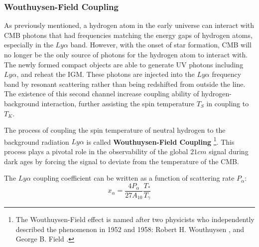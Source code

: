 \documentclass[12pt, TexShade, letterpaper]{report}
\begin{document}
\subsubsection{Wouthuysen-Field Coupling}
As previously mentioned, a hydrogen atom in the early universe can interact with CMB photons that had frequencies matching the energy gaps of hydrogen atoms, especially in the $Ly\alpha$ band. However, with the onset of star formation, CMB will no longer be the only source of photons for the hydrogen atom to interact with. The newly formed compact objects are able to generate UV photons including $Ly\alpha$, and reheat the IGM. These photons are injected into the $Ly\alpha$ frequency band by resonant scattering rather than being redshifted from outside the line. The existence of this second channel increase coupling ability of hydrogen-background interaction, further assisting the spin temperature $T_S$ in coupling to $T_K$.\par
The process of coupling the spin temperature of neutral hydrogen to the background radiation $Ly\alpha$ is called \textbf{Wouthuysen-Field Coupling} \cite{barkana2001beginning}\footnote{The Wouthuysen-Field effect is named after two physicists who independently described the phenomenon in 1952 and 1958: Robert H. Wouthuysen \cite{wouthuysen_original}, and George B. Field \cite{field_original}.}. This process plays a pivotal role in the observability of the global $21cm$ signal during dark ages by forcing the signal to deviate from the temperature of the CMB.\par
The $Ly\alpha$ coupling coefficient can be written as a function of scattering rate $P_\alpha$:
\begin{equation}
    x_\alpha = \frac{4P_\alpha}{27 A_{10}} \frac{T_*}{T_\gamma}
\end{equation}
\end{document}
